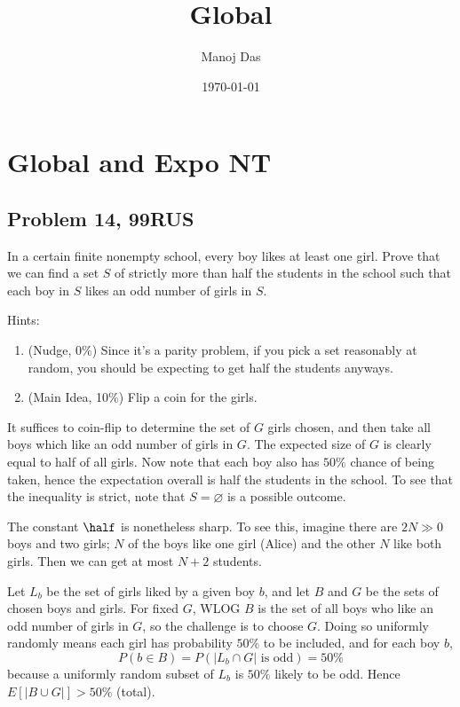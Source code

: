\documentclass[11pt,twoside]{scrartcl}
\begin{document}
\title{Global}


\author{Manoj Das}
\date{\today}
\section{Global and Expo NT}
\subsection{Problem 14, 99RUS}
\begin{problem}[Russia 1999]
    In a certain finite nonempty school, every boy likes at least one girl. Prove that we can find a set $S$ of strictly more than half the students in the school such that each boy in $S$ likes an odd number of girls in $S$.
\end{problem}

Hints:
\begin{enumerate}
    \item (Nudge, 0\%) Since it's a parity problem, if you pick a set reasonably at random, you should be expecting to get half the students anyways.
    \item (Main Idea, 10\%) Flip a coin for the girls.
\end{enumerate}
\begin{soln}
    It suffices to coin-flip to determine the set of $G$ girls chosen,
and then take all boys which like an odd number of girls in $G$.
The expected size of $G$ is clearly equal to half of all girls.
Now note that each boy also has $50\%$ chance of being taken,
hence the expectation overall is half the students in the school.
To see that the inequality is strict,
note that $S = \varnothing$ is a possible outcome.

\begin{remark*}
The constant $\half$ is nonetheless sharp.
To see this, imagine there are $2N \gg 0$ boys and two girls;
$N$ of the boys like one girl (Alice)
and the other $N$ like both girls.
Then we can get at most $N+2$ students.
\end{remark*}

\end{soln}

\begin{soln}
    Let $L_b$ be the set of girls liked by a given boy $b$, and let $B$ and $G$ be the sets of chosen
    boys and girls. For fixed $G$, WLOG $B$ is the set of all boys who like an odd number of
    girls in $G$, so the challenge is to choose $G$. Doing so uniformly randomly means each girl
    has probability $50\%$ to be included, and for each boy $b$,
    \[P(b \in B) = P(|L_b \cap G| \text{ is odd}) = 50\%\]
    because a uniformly random subset of $L_b$ is $50\%$ likely to be odd. Hence $E[|B \cup G|] > 50\%$ (total).
\end{soln}
\end{document}
